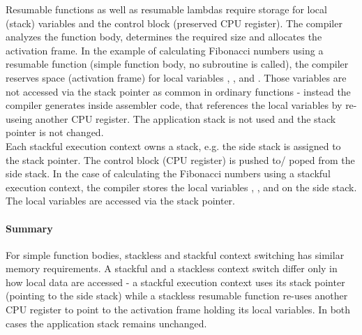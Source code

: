Resumable functions as well as resumable lambdas require storage for local
(stack) variables and the control block (preserved CPU register). The compiler
analyzes the function body, determines the required size and allocates the
activation frame.
In the example of calculating Fibonacci numbers using a resumable function
(simple function body, no subroutine is called), the compiler reserves space
(activation frame) for local variables , ,  and .
Those variables are not accessed via the stack pointer as common in ordinary
functions - instead the compiler generates inside  assembler code,
that references the local variables by re-useing another CPU register. The
application stack is not used and the stack pointer is not changed.\\
\newline
Each stackful execution context owns a stack, e.g. the side stack is assigned to
the stack pointer. The control block (CPU register) is pushed to/ poped from the
side stack.
In the case of calculating the Fibonacci numbers using a stackful execution
context, the compiler stores the local variables , ,  and
 on the side stack. The local variables are accessed via the stack
pointer.
\paragraph*{Summary}
For simple function bodies, stackless and stackful context switching has similar
memory requirements. A stackful and a stackless context switch differ only in
how local data are accessed - a stackful execution context uses its stack
pointer (pointing to the side stack) while a stackless resumable function
re-uses another CPU register to point to the activation frame holding its local
variables. In both cases the application stack remains unchanged.

